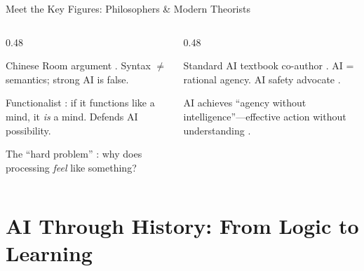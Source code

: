 \documentclass[aspectratio=169,11pt]{beamer}
\begin{document}
\begin{frame}{Meet the Key Figures: Philosophers \& Modern Theorists}
\begin{columns}[T]
\begin{column}{0.48\textwidth}
\begin{figurebox}
\scriptsize
Chinese Room argument \parencite{searle_minds_brains}. Syntax $\neq$ semantics; strong AI is false.
\end{figurebox}

\vspace{0.05em}
\begin{figurebox}
\scriptsize
Functionalist \parencite{dennett_consciousness}: if it functions like a mind, it \emph{is} a mind. Defends AI possibility.
\end{figurebox}

\vspace{0.05em}
\begin{figurebox}
\scriptsize
The ``hard problem'' \parencite{chalmers_conscious_mind}: why does processing \emph{feel} like something?
\end{figurebox}
\end{column}
\begin{column}{0.48\textwidth}
\begin{figurebox}
\scriptsize
Standard AI textbook co-author \parencite{russell_norvig_ai}. AI = rational agency. AI safety advocate \parencite{russell_human_compatible}.
\end{figurebox}

\vspace{0.05em}
\begin{figurebox}
\scriptsize
AI achieves ``agency without intelligence''---effective action without understanding \parencite{floridi_ethics_ai}.
\end{figurebox}
\end{column}
\end{columns}
\end{frame}

\section{AI Through History: From Logic to Learning}
\end{document}
